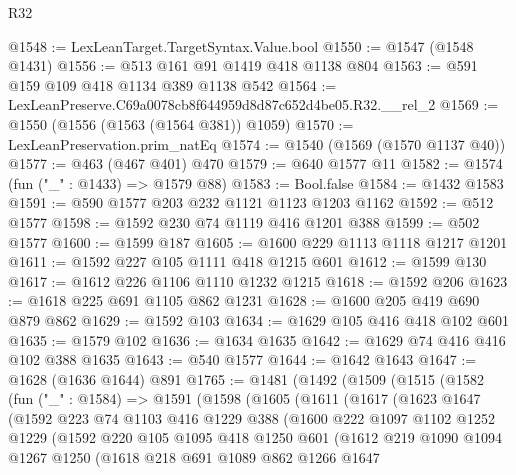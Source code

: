 \begin{lexlean}{R32}
\begin{coremodule}
@1548 := LexLeanTarget.TargetSyntax.Value.bool
@1550 := @1547 (@1548 @1431)
@1556 := @513 @161 @91 @1419 @418 @1138 @804
@1563 := @591 @159 @109 @418 @1134 @389 @1138 @542
@1564 := LexLeanPreserve.C69a0078cb8f644959d8d87c652d4be05.R32.__rel_2
@1569 := @1550 (@1556 (@1563 (@1564 @381)) @1059)
@1570 := LexLeanPreservation.prim_natEq
@1574 := @1540 (@1569 (@1570 @1137 @40))
@1577 := @463 (@467 @401) @470
@1579 := @640 @1577 @11
@1582 := @1574 (fun ("_" : @1433) => @1579 @88)
@1583 := Bool.false
@1584 := @1432 @1583
@1591 := @590 @1577 @203 @232 @1121 @1123 @1203 @1162
@1592 := @512 @1577
@1598 := @1592 @230 @74 @1119 @416 @1201 @388
@1599 := @502 @1577
@1600 := @1599 @187
@1605 := @1600 @229 @1113 @1118 @1217 @1201
@1611 := @1592 @227 @105 @1111 @418 @1215 @601
@1612 := @1599 @130
@1617 := @1612 @226 @1106 @1110 @1232 @1215
@1618 := @1592 @206
@1623 := @1618 @225 @691 @1105 @862 @1231
@1628 := @1600 @205 @419 @690 @879 @862
@1629 := @1592 @103
@1634 := @1629 @105 @416 @418 @102 @601
@1635 := @1579 @102
@1636 := @1634 @1635
@1642 := @1629 @74 @416 @416 @102 @388 @1635
@1643 := @540 @1577
@1644 := @1642 @1643
@1647 := @1628 (@1636 @1644) @891
@1765 := @1481
    (@1492
      (@1509
        (@1515
          (@1582
            (fun ("_" : @1584) =>
            @1591
              (@1598
                (@1605
                  (@1611
                    (@1617
                      (@1623
                        @1647
                        (@1592
                          @223
                          @74
                          @1103
                          @416
                          @1229
                          @388
                          (@1600
                            @222
                            @1097
                            @1102
                            @1252
                            @1229
                            (@1592
                              @220
                              @105
                              @1095
                              @418
                              @1250
                              @601
                              (@1612
                                @219
                                @1090
                                @1094
                                @1267
                                @1250
                                (@1618
                                  @218
                                  @691
                                  @1089
                                  @862
                                  @1266
                                  @1647

\end{coremodule}
\end{lexlean}
